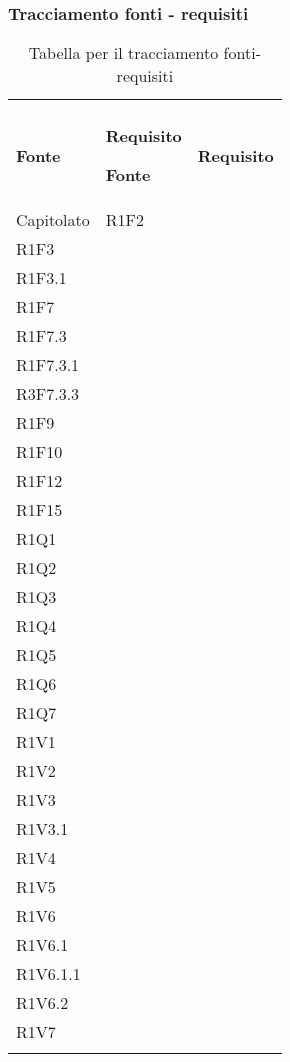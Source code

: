 \subsubsection{Tracciamento fonti - requisiti}

\renewcommand{\arraystretch}{2.2}

\begin{longtable}{|C{6.5cm}|C{6.5cm}|}

	\caption{Tabella per il tracciamento fonti-requisiti}\\
	\textbf{Fonte} & \textbf{Requisito}
	\endfirsthead
	
	\hline
	\textbf{Fonte} & \textbf{Requisito}
	\tabularnewline
	\endhead

	Capitolato &
	\centering
	R1F2\\
	R1F3 \\
	R1F3.1\\
	R1F7\\
	R1F7.3\\
	R1F7.3.1\\
	R3F7.3.3\\
	R1F9\\
	R1F10\\
	R1F12\\
	R1F15\\
	R1Q1\\
	R1Q2\\
	R1Q3\\
	R1Q4\\
	R1Q5\\
	R1Q6\\
	R1Q7\\
	R1V1\\
	R1V2\\
	R1V3\\
	R1V3.1\\
	R1V4\\
	R1V5\\
	R1V6\\
	R1V6.1\\
	R1V6.1.1\\
	R1V6.2\\
	R1V7\\

	\tabularnewline


\end{longtable}
